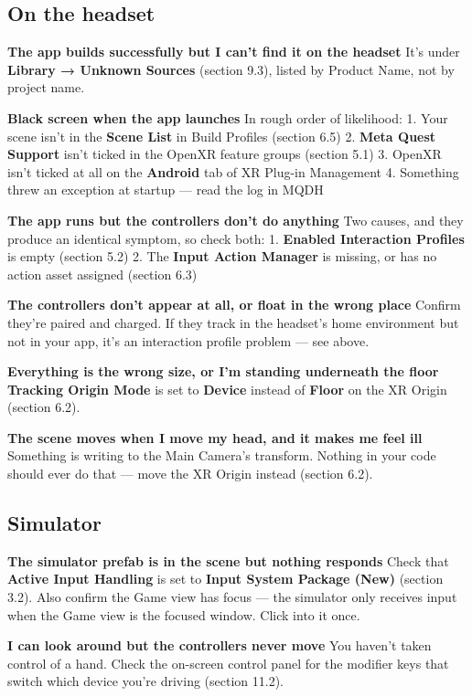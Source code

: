 \documentclass[11pt,a4paper]{article}
\begin{document}
\subsection{On the headset}\label{on-the-headset}

\textbf{The app builds successfully but I can't find it on the headset}
It's under \textbf{Library → Unknown Sources} (section 9.3), listed by Product Name, not by
project name.

\textbf{Black screen when the app launches}
In rough order of likelihood:
1. Your scene isn't in the \textbf{Scene List} in Build Profiles (section 6.5)
2. \textbf{Meta Quest Support} isn't ticked in the OpenXR feature groups (section 5.1)
3. OpenXR isn't ticked at all on the \textbf{Android} tab of XR Plug-in Management
4. Something threw an exception at startup --- read the log in MQDH

\textbf{The app runs but the controllers don't do anything}
Two causes, and they produce an identical symptom, so check both:
1. \textbf{Enabled Interaction Profiles} is empty (section 5.2)
2. The \textbf{Input Action Manager} is missing, or has no action asset assigned (section 6.3)

\textbf{The controllers don't appear at all, or float in the wrong place}
Confirm they're paired and charged. If they track in the headset's home environment but
not in your app, it's an interaction profile problem --- see above.

\textbf{Everything is the wrong size, or I'm standing underneath the floor}
\textbf{Tracking Origin Mode} is set to \textbf{Device} instead of \textbf{Floor} on the XR Origin
(section 6.2).

\textbf{The scene moves when I move my head, and it makes me feel ill}
Something is writing to the Main Camera's transform. Nothing in your code should ever do
that --- move the XR Origin instead (section 6.2).

\subsection{Simulator}\label{simulator}

\textbf{The simulator prefab is in the scene but nothing responds}
Check that \textbf{Active Input Handling} is set to \textbf{Input System Package (New)} (section
3.2). Also confirm the Game view has focus --- the simulator only receives input when the
Game view is the focused window. Click into it once.

\textbf{I can look around but the controllers never move}
You haven't taken control of a hand. Check the on-screen control panel for the modifier
keys that switch which device you're driving (section 11.2).
\end{document}
